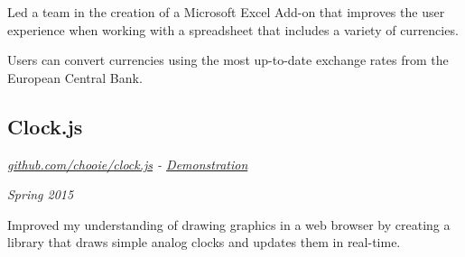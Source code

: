 Led a team in the creation of a Microsoft Excel Add-on that improves the user
experience when working with a spreadsheet that includes a variety of
currencies.

Users can convert currencies using the most up-to-date exchange rates from the
European Central Bank.

\subsection*{Clock.js}
\noindent\begin{minipage}[b]{0.5\textwidth}
  \flushleft
  \emph{
    \href{https://github.com/chooie/clock.js} {github.com/chooie/clock.js} -
    \href {https://chooie.github.io/clock.js} {Demonstration}
  }
\end{minipage}
\noindent\begin{minipage}[b]{0.5\textwidth}
  \flushright
  \emph{Spring 2015}
\end{minipage}

Improved my understanding of drawing graphics in a web browser by creating a
library that draws simple analog clocks and updates them in real-time.

